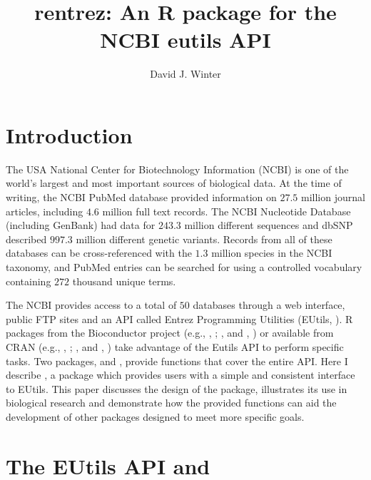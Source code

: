 \title{rentrez: An R package for the NCBI eutils API}
\author{David J. Winter}

\maketitle


\section{Introduction}

The USA National Center for Biotechnology Information (NCBI) is one of the world's 
largest and most important sources of biological data. At the time of writing, the NCBI
PubMed database provided information on $27.5$ million journal
articles, including $4.6$ million full text records. The NCBI
Nucleotide Database (including GenBank) had data for $243.3$ million different sequences and dbSNP described $997.3$ 
million different genetic variants. Records from all of these databases can be 
cross-referenced with the $1.3$ million species in the NCBI taxonomy, and PubMed entries can be searched for using a 
controlled vocabulary containing $272$ thousand unique terms. 

The NCBI provides access to a total of $50$ databases 
through a web interface, public FTP sites and an API called Entrez Programming
Utilities (EUtils, \citealt{sayers_EUtils}). R packages from the Bioconductor 
project (e.g., , \citealt{genomes}; , 
\citealt{RMassBank} and , \citealt{MeSHSim}) or available from 
CRAN (e.g., , \citealt{APE}; , \citealt{RISmed} and
, \citealt{miner}) take advantage of the Eutils API to 
perform specific tasks. Two packages,  and  
\citep{reutils}, provide functions that cover the entire API.  Here I describe 
, a package which provides users with a simple and consistent 
interface to EUtils. This paper discusses the design of the package, illustrates 
its use in biological research and demonstrate how the provided functions can 
aid the development of other packages designed to meet more specific goals.


\section{The EUtils API and  }

